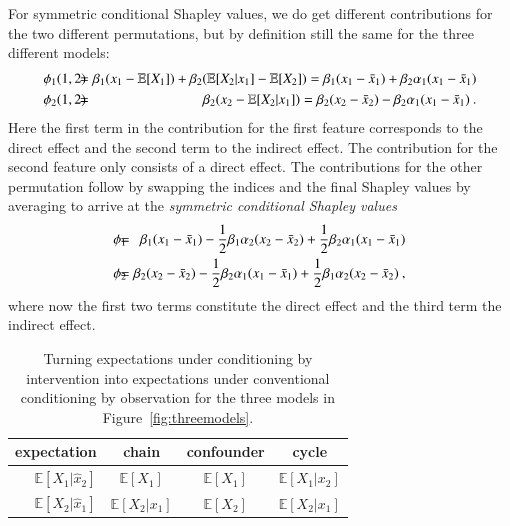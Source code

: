 \documentclass{article}
\newcommand{\expectation}{\mathbb{E}}
\newcommand{\sdo}[1]{\hat{x}_{#1}}
\newcommand{\bx}{\bar{x}}
\newcommand{\isequal}{\hspace*{-2.5mm} & = & \hspace*{-2.5mm}}
\begin{document}
For symmetric conditional Shapley values, we do get different contributions for the two different permutations, but by definition still the same for the three different models:
\begin{eqnarray}
\phi_1(1,2) \isequal \beta_1 (x_1 - \expectation[X_1]) + \beta_2 (\expectation[X_2|x_1] - \expectation[X_2]) = \beta_1 (x_1 - \bx_1) + \beta_2 \alpha_1 (x_1 - \bx_1) \nonumber \\
\phi_2(1,2) \isequal \beta_2 (x_2 - \expectation[X_2|x_1]) = \beta_2 (x_2 - \bx_2) - \beta_2 \alpha_1 (x_1 - \bx_1) \: .
\label{eq:asymmetric}
\end{eqnarray}
Here the first term in the contribution for the first feature corresponds to the direct effect and the second term to the indirect effect. The contribution for the second feature only consists of a direct effect. The contributions for the other permutation follow by swapping the indices and the final Shapley values by averaging to arrive at the {\em symmetric conditional Shapley values}
\begin{eqnarray}
\phi_1 \isequal \beta_1 (x_1 - \bx_1) - {1 \over 2} \beta_1 \alpha_2 (x_2 - \bx_2) + {1 \over 2} \beta_2 \alpha_1 (x_1 - \bx_1) \nonumber \\
\phi_2 \isequal \beta_2 (x_2 - \bx_2) - {1 \over 2} \beta_2 \alpha_1 (x_1 - \bx_1) + {1 \over 2} \beta_1 \alpha_2 (x_2 - \bx_2) \: ,
\label{eq:symmetric}
\end{eqnarray}
where now the first two terms constitute the direct effect and the third term the indirect effect.

\begin{table}
\begin{center}
\begin{tabular}{r|ccc} \toprule
expectation & chain & confounder & cycle \\ \midrule
$\expectation[X_1|\sdo{2}]$ & $\expectation[X_1]$ & $\expectation[X_1]$ & $\expectation[X_1|x_2]$ \\
$\expectation[X_2|\sdo{1}]$ & $\expectation[X_2|x_1]$ & $\expectation[X_2]$ & $\expectation[X_2|x_1]$ \\
\bottomrule
\end{tabular}
\end{center}
\caption{Turning expectations under conditioning by intervention into expectations under conventional conditioning by observation for the three models in Figure~\ref{fig:threemodels}.}
\label{tab:rewriting}
\end{table}
\end{document}
